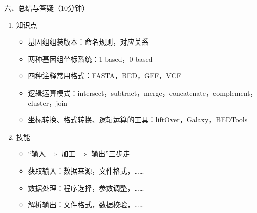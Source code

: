 \documentclass{TIJMUjiaoanLL}
\begin{document}
\noindent
六、总结与答疑（10分钟）
\begin{enumerate}
  \item 知识点
    \begin{itemize}
      \item 基因组组装版本：命名规则，对应关系
      \item 两种基因组坐标系统：1-based，0-based
      \item 四种注释常用格式：FASTA，BED，GFF，VCF
      \item 逻辑运算模式：intersect，subtract，merge，concatenate，complement，cluster，join
      \item 坐标转换、格式转换、逻辑运算的工具：liftOver，Galaxy，BEDTools
    \end{itemize}
  \item 技能
    \begin{itemize}
      \item “输入 $\Rightarrow$ 加工 $\Rightarrow$ 输出”三步走
      \item 获取输入：数据来源，文件格式，……
      \item 数据处理：程序选择，参数调整，……
      \item 解析输出：文件格式，数据校验，……
    \end{itemize}
\end{enumerate}


\otherTail
\end{document}

